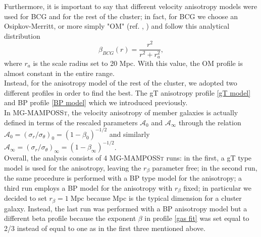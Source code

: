 Furthermore, it is important to say that different velocity anisotropy models were used for BCG and for the rest of the cluster; in fact, for BCG we choose an Osipkov-Merritt, or more simply "OM" (ref. \cite{Osipkov_1979}, \cite{Merritt_1985}) and follow this analytical distribution
\begin{equation}
    \beta_{BCG} (r) = \frac{r^2}{r^2 + r^2_a},
\end{equation}
where $r_a$ is the scale radius set to 20 Mpc. With this value, the OM profile is almost constant in the entire range.\\ Instead, for the anisotropy model of the rest of the cluster, we adopted two different profiles in order to find the best. The gT anisotropy profile \eqref{gT model} and BP profile \eqref{BP model} which we introduced previously.\\
In \textsc{MG-MAMPOSSt}, the velocity anisotropy of member galaxies is actually defined in terms of the rescaled parameters $\mathcal{A}_0$ and $\mathcal{A}_\infty$ through the relation $\mathcal{A}_0 = (\sigma_r/\sigma_\theta)_0 = (1-\beta_0)^{-1/2}$ and similarly $\mathcal{A}_\infty = (\sigma_r/\sigma_\theta)_\infty = (1-\beta_\infty)^{-1/2}$.\\

Overall, the analysis consists of 4 \textsc{MG-MAMPOSSt} runs: in the first, a gT type model is used for the anisotropy, leaving the $r_\beta$ parameter free; in the second run, the same procedure is performed with a BP type model for the anisotropy; a third run employs a BP model for the anisotropy with $r_\beta$ fixed; in particular we decided to set $r_\beta = 1 \; \text{Mpc}$ because Mpc is the typical dimension for a cluster galaxy. Instead, the last run was performed with a BP anisotropy model but a different beta profile because the exponent  $\beta$ in profile \eqref{gas fit} was set equal to 2/3 instead of equal to one as in the first three mentioned above.\\



